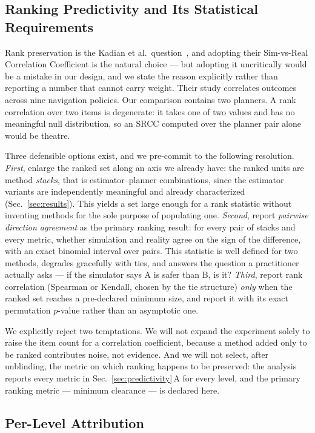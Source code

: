 \subsection{Ranking Predictivity and Its Statistical Requirements}

Rank preservation is the Kadian et al.\ question~\cite{kadian2020simrealp},
and adopting their Sim-vs-Real Correlation Coefficient is the natural choice
--- but adopting it uncritically would be a mistake in our design, and we
state the reason explicitly rather than reporting a number that cannot carry
weight. Their study correlates outcomes across nine navigation policies. Our
comparison contains two planners. A rank correlation over two items is
degenerate: it takes one of two values and has no meaningful null
distribution, so an SRCC computed over the planner pair alone would be
theatre.

Three defensible options exist, and we pre-commit to the following
resolution. \emph{First}, enlarge the ranked set along an axis we already
have: the ranked units are method \emph{stacks}, that is
estimator--planner combinations, since the estimator variants are
independently meaningful and already characterized (Sec.~\ref{sec:results}).
This yields a set large enough for a rank statistic without inventing methods
for the sole purpose of populating one. \emph{Second}, report
\emph{pairwise direction agreement} as the primary ranking result: for every
pair of stacks and every metric, whether simulation and reality agree on the
sign of the difference, with an exact binomial interval over pairs. This
statistic is well defined for two methods, degrades gracefully with ties, and
answers the question a practitioner actually asks --- if the simulator says A
is safer than B, is it? \emph{Third}, report rank correlation (Spearman or
Kendall, chosen by the tie structure) \emph{only} when the ranked set reaches
a pre-declared minimum size, and report it with its exact permutation
$p$-value rather than an asymptotic one.

We explicitly reject two temptations. We will not expand the experiment
solely to raise the item count for a correlation coefficient, because a
method added only to be ranked contributes noise, not evidence. And we will
not select, after unblinding, the metric on which ranking happens to be
preserved: the analysis reports every metric in
Sec.~\ref{sec:predictivity}\,A for every level, and the primary ranking
metric --- minimum clearance --- is declared here.

\subsection{Per-Level Attribution}

